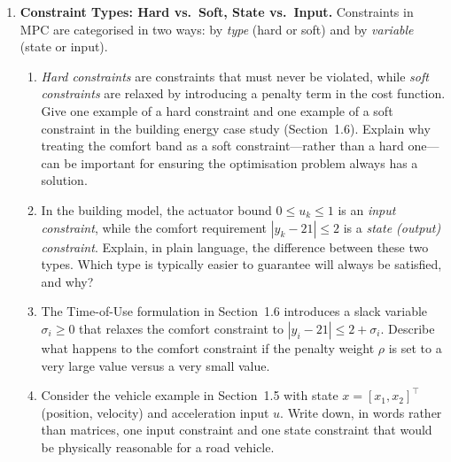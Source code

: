 \begin{enumerate}
	\item \textbf{Constraint Types: Hard vs.\ Soft, State vs.\ Input.}
	Constraints in MPC are categorised in two ways: by \emph{type} (hard or soft) and by \emph{variable} (state or input).
	\begin{enumerate}
		\item[(a)] \emph{Hard constraints} are constraints that must never be violated, while \emph{soft constraints} are relaxed by introducing a penalty term in the cost function. Give one example of a hard constraint and one example of a soft constraint in the building energy case study (Section~1.6). Explain why treating the comfort band as a soft constraint—rather than a hard one—can be important for ensuring the optimisation problem always has a solution.
		\item[(b)] In the building model, the actuator bound $0 \le u_k \le 1$ is an \emph{input constraint}, while the comfort requirement $|y_k - 21| \le 2$ is a \emph{state (output) constraint}. Explain, in plain language, the difference between these two types. Which type is typically easier to guarantee will always be satisfied, and why?
		\item[(c)] The Time-of-Use formulation in Section~1.6 introduces a slack variable $\sigma_i \ge 0$ that relaxes the comfort constraint to $|y_i - 21| \le 2 + \sigma_i$. Describe what happens to the comfort constraint if the penalty weight $\rho$ is set to a very large value versus a very small value.
		\item[(d)] Consider the vehicle example in Section~1.5 with state $x = [x_1, x_2]^\top$ (position, velocity) and acceleration input $u$. Write down, in words rather than matrices, one input constraint and one state constraint that would be physically reasonable for a road vehicle.
	\end{enumerate}


\end{enumerate}
